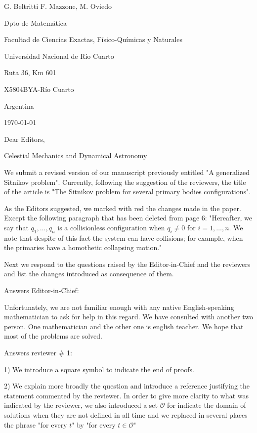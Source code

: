 \documentclass{article}
\begin{document}
\begin{flushright}
G. Beltritti
F. Mazzone,
M. Oviedo


Dpto de Matem\'atica

Facultad de Ciencias Exactas, F\'isico-Qu\'imicas y Naturales

Universidad Nacional de R\'io Cuarto

Ruta 36, Km 601

X5804BYA-R\'io Cuarto

Argentina
\end{flushright}

\today
\vspace{1cm}

Dear Editors,

Celestial Mechanics and Dynamical Astronomy

\vspace{.5cm}

We  submit a revised version of our manuscript previously entitled "A generalized Sitnikov problem". Currently, following the suggestion of the reviewers, the title of the article is  "The Sitnikov problem for several primary bodies configurations".

As the Editors suggested, we marked with red the changes made in the paper. Except the following paragraph that has been deleted from page 6: "Hereafter,  we say that   $q_1,\ldots,q_n$ is a collisionless configuration  when $q_i\neq 0$ for $i=1,\ldots,n$. We note that despite of this fact the system can have collisions; for example,  when the primaries have a homothetic collapsing motion."



Next we respond to the questions raised by the  Editor-in-Chief and the  reviewers and list the changes introduced as consequence of them.

Answers  Editor-in-Chief:

Unfortunately, we are not familiar enough with any native English-speaking mathematician  to ask for help in this regard.   We have consulted with another two person. One mathematician and the other one is english teacher. We hope that most of the problems are solved.

Answers  reviewer # 1:

1) We introduce a square symbol to indicate the end of proofs.

2) We explain more broadly the question and introduce a reference justifying the statement commented by the reviewer. In order to give more clarity to what was indicated by the reviewer, we also introduced a set $ \mathcal {O} $  for indicate the domain of solutions when they are not defined in all time  and we replaced in several places the phrase "for every $ t $" by "for every $ t \in \mathcal {O} $"
\end{document}
